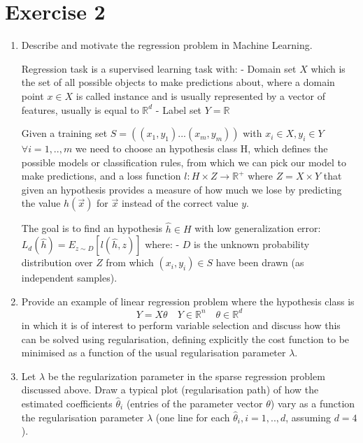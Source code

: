 \documentclass[a4paper,11pt,oneside]{book}
\begin{document}
\section{Exercise 2}
    \begin{enumerate}
        \item Describe and motivate the regression problem in Machine Learning.
            \begin{solution}
                Regression task is a supervised learning task with:
                - Domain set $X$ which is the set of all possible objects to make predictions about, where a domain point $x \in X$ is called instance and is usually represented by a vector of features, usually is equal to $\mathbb{R}^d$
                - Label set $Y = \mathbb{R}$
                
                Given a training set $S = ((x_1,y_1) ... (x_m,y_m))$ with $x_i \in X, y_i \in Y$ $\forall i = 1,..,m$ we need to choose an hypothesis class H, which defines the possible models or classification rules, from which we can pick our model to make predictions, and a loss function $l: H\times Z \to \mathbb{R}^+$ where $Z = X\times Y$ that given an hypothesis provides a measure of how much we lose by predicting the value $h(\vec{x})$ for $\vec{x}$ instead of the correct value $y$.
                
                The goal is to find an hypothesis $\hat{h} \in H$ with low generalization error: $L_d(\hat{h}) = E_{z\sim D}[l(\hat{h},z)]$ where:
                - $D$ is the unknown probability distribution over $Z$ from which $(x_i,y_i) \in S$ have been drawn (as independent samples).
            \end{solution}
        \item Provide an example of linear regression problem where the hypothesis class is
        $$Y = X\theta \quad Y \in \mathbb{R}^n \quad \theta \in \mathbb{R}^d$$
        in which it is of interest to perform variable selection and discuss how this can be solved using regularisation, defining explicitly the cost function to be minimised as a function of the usual regularisation parameter $\lambda$.
        \clearpage
        \item Let $\lambda$ be the regularization parameter in the sparse regression problem discussed above. Draw a typical plot (regularisation path) of how the estimated coefficients $\hat{\theta}_i$ (entries of the parameter vector $\theta$) vary as a function the regularisation parameter $\lambda$ (one line for each $\hat{\theta}_i, i = 1,..,d$, assuming $d = 4$).
        

\end{enumerate}
\end{document}
